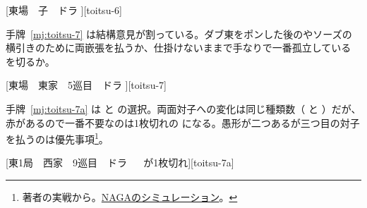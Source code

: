 \documentclass[../nankiru_main.tex]{subfiles}
\begin{document}
[東場　子　ドラ ][toitsu-6]

手牌~\ref{mj:toitsu-7} は結構意見が割っている\citep[][pp.~82--83, p.~215]{fkt}。ダブ東をポンした後のやソーズの横引きのために両嵌張を払うか、仕掛けないままで手なりで一番孤立している  を切るか。

[東場　東家　5巡目　ドラ ][toitsu-7]

手牌~\ref{mj:toitsu-7a} は  と  の選択。両面対子への変化は同じ種類数（ と ）だが、赤があるので一番不要なのは1枚切れの  になる。愚形が二つあるが三つ目の対子を払うのは優先事項\footnote{著者の実戦から。\href{https://naga.dmv.nico/htmls/b1ce439d70b8dfc48152e539f75e29d57763308a9de1dfafc95f65a9529f2757v2_2.html?tw=2}{NAGAのシミュレーション}。}。

[東1局　西家　9巡目　ドラ 　 が1枚切れ][toitsu-7a]

%
%  
%  
%
%
\end{document}
